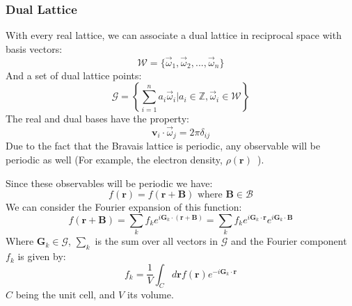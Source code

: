 \documentclass[12pt]{article}
\begin{document}
\subsubsection{Dual Lattice}
With every real lattice, we can associate a dual lattice in reciprocal space with basis vectors:
\begin{equation}\label{eq:dual_basis}
	\mathcal{W} = \{\vec{\omega}_1, \vec \omega _2, ..., \vec{\omega}_n\}
\end{equation}
And a set of dual lattice points:
\begin{equation}\label{eq:dual_lattice}
	\mathcal{G} = \left \{\sum_{i=1}^n a_i\vec{\omega}_i \Big | a_i \in \mathbb{Z}, \vec{\omega}_i \in \mathcal{W}  \right \}
\end{equation}
The real and dual bases have the property:
\begin{equation}
	\mathbf v _ i \cdot \vec\omega_j = 2\pi\delta_{ij}
\end{equation}
Due to the fact that the Bravais lattice is periodic, any observable will be periodic as well (For example, the electron density, $\rho(\mathbf{r})$\ ).

Since these observables will be periodic we have:
\begin{equation}\label{eq:periodic_observable}
	f(\mathbf r) = f(\mathbf r + \mathbf B) \text{ where } \mathbf B \in \mathcal B
\end{equation}
We can consider the Fourier expansion of this function:
\begin{equation}\label{eq:f_fourier_expansion}
	f(\mathbf r + \mathbf B) = \sum_k f_k e ^ {i \mathbf G_k\cdot(\mathbf r + \mathbf B)} 
	= \sum _k f_k e ^ {i \mathbf G_k \cdot \mathbf r} e ^ {i \mathbf G_k \cdot \mathbf B}
\end{equation}
Where $\mathbf G_k \in \mathcal G$, $\sum_k$ is the sum over all vectors in $\mathcal G$ and the Fourier component $f_k$ is given by:
\begin{equation}
	f_k = \frac{1}{V}\int_Cd\mathbf rf(\mathbf r)e^{-i\mathbf G_k\cdot \mathbf r}
\end{equation}
$C$ being the unit cell, and $V$ its volume.
\end{document}
